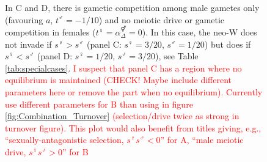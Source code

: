 \documentclass[12pt]{article}
\begin{document}
\begin{figure}[!h]
{In C and D, there is gametic competition among male gametes only (favouring $a$, $t^\male=-1/10$) and no meiotic drive or gametic competition in females ($t^\female=\alpha^\Hermaphrodite_{\Delta}=0$). 
In this case, the neo-W does not invade if $s^\female>s^\male$ (panel C: $s^\female=3/20$, $s^\male=1/20$) but does if $s^\female<s^\male$ (panel D: $s^\female=1/20$, $s^\male=3/20$), see Table \ref{tab:specialcases}.
\textcolor{red}{I suspect that panel C has a region where no equilibrium is maintained (CHECK! Maybe include different parameters here or remove the part when no equilibrium). Currently use different parameters for B than using in figure \ref{fig:Combination_Turnover} (selection/drive twice as strong in turnover figure). This plot would also benefit from titles giving, e.g., ``sexually-antagonistic selection, $s^\female s^\male<0$'' for A, ``male meiotic drive, $s^\female s^\male>0$'' for B}
}
\label{fig:Combination_Centimorgans}
\end{figure}
\newpage



\end{document}
